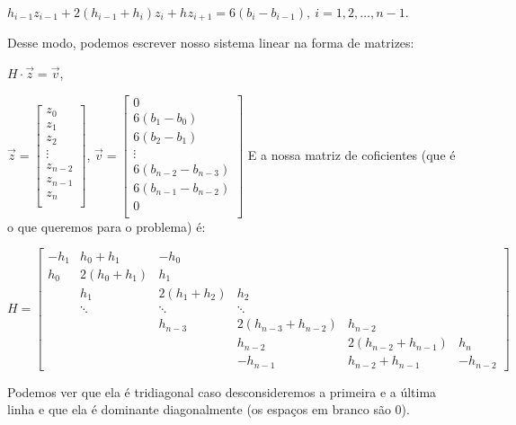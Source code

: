\documentclass[12pt]{article}
\begin{document}
$h_{i-1}z_{i-1}+2(h_{i-1}+h_i)z_i+h_{}z_{i+1} = 6(b_i-b_{i-1}),\: i=1,2,\dots,n-1$.

Desse modo, podemos escrever nosso sistema linear na forma de matrizes:

$H\cdot\vec{z} = \vec{v}$,

$\vec{z} = 
\begin{bmatrix}
  
  z_0 \\
  z_1 \\
  z_2 \\
  \vdots \\
  z_{n-2} \\
  z_{n-1} \\
  z_n \\
  
\end{bmatrix}
$, 
$\vec{v} =
\begin{bmatrix}

  0 \\
  6(b_1-b_0) \\
  6(b_2-b_1) \\
  \vdots \\
  6(b_{n-2}-b_{n-3}) \\
  6(b_{n-1}-b_{n-2}) \\
  0 \\
  
\end{bmatrix}
$
E a nossa matriz de coficientes (que é o que queremos para o problema) é:

$H =
\begin{bmatrix}

  -h_1 & h_0+h_1 & -h_0 \\
  h_0 & 2(h_0+h_1) & h_1 \\
  & h_1 & 2(h_1+h_2) & h_2 \\
  & \ddots & \ddots & \ddots \\
  & & h_{n-3} & 2(h_{n-3}+h_{n-2}) & h_{n-2} \\
  & & & h_{n-2} & 2(h_{n-2}+h_{n-1}) & h_n \\
  & & & -h_{n-1} & h_{n-2}+h_{n-1} & -h_{n-2}
  
\end{bmatrix}
$

Podemos ver que ela é tridiagonal caso desconsideremos a primeira e a última linha e que ela é dominante diagonalmente (os espaços em branco são 0).
\end{document}
